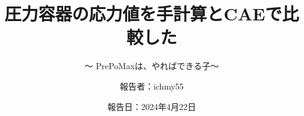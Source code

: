 %
\title{圧力容器の応力値を手計算とCAEで比較した}
\subtitle{～ PrePoMaxは、やればできる子～}
%
%
\date[4-22-2024]{報告日：2024年4月22日}
\author[ichmy55]{報告者：ichmy55}
